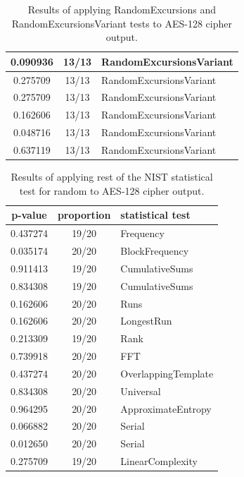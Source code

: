 \documentclass[conference]{IEEEtran}
\begin{document}
\begin{center}
\begin{table}[H]
\begin{tabular}{|c|c|l|}
0.090936         & 13/13               & RandomExcursionsVariant   \\ \hline
0.275709         & 13/13               & RandomExcursionsVariant   \\ \hline
0.275709         & 13/13               & RandomExcursionsVariant   \\ \hline
0.162606         & 13/13               & RandomExcursionsVariant   \\ \hline
0.048716         & 13/13               & RandomExcursionsVariant   \\ \hline
0.637119         & 13/13               & RandomExcursionsVariant   \\ \hline
\end{tabular}
\caption{Results of applying RandomExcursions and RandomExcursionsVariant tests to AES-128 cipher output.}
\label{nistresults2}
\end{table}
\end{center}

\begin{center}
\begin{table}[H]
\renewcommand{\arraystretch}{1.2}
\centering
\begin{tabular}{|c|c|l|}
\hline
\textbf{p-value} & \textbf{proportion} & \textbf{statistical test} \\ \hline
0.437274         & 19/20               & Frequency                 \\ \hline
0.035174         & 20/20               & BlockFrequency            \\ \hline
0.911413         & 19/20               & CumulativeSums            \\ \hline
0.834308         & 19/20               & CumulativeSums            \\ \hline
0.162606         & 20/20               & Runs                      \\ \hline
0.162606         & 20/20               & LongestRun                \\ \hline
0.213309         & 19/20               & Rank                      \\ \hline
0.739918         & 20/20               & FFT                       \\ \hline
0.437274         & 20/20               & OverlappingTemplate       \\ \hline
0.834308         & 20/20               & Universal                 \\ \hline
0.964295         & 20/20               & ApproximateEntropy        \\ \hline
0.066882         & 20/20               & Serial                    \\ \hline
0.012650         & 20/20               & Serial                    \\ \hline
0.275709         & 19/20               & LinearComplexity          \\ \hline
\end{tabular}
\caption{Results of applying rest of the NIST statistical test for random to AES-128 cipher output.}
\label{nistresults3}
\end{table}
\end{center}
\end{document}
